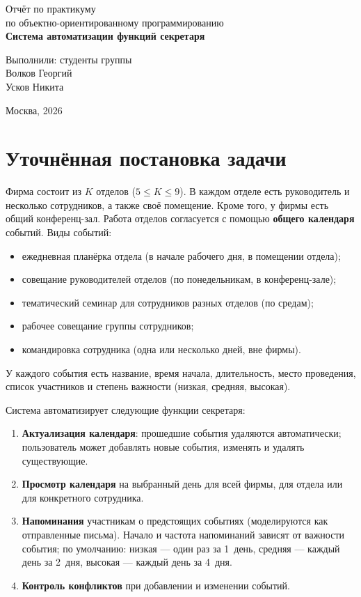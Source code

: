\documentclass[12pt,a4paper]{article}
\begin{document}
\begin{titlepage}
\centering
\vfill
{\large Отчёт по практикуму\\ по объектно-ориентированному программированию}\\[1cm]
{\LARGE\bfseries Система автоматизации функций секретаря}
\vfill
\begin{flushright}
Выполнили: студенты группы \underline{\hspace{2cm}}\\
Волков Георгий\\
Усков Никита
\end{flushright}
\vfill
Москва, 2026
\end{titlepage}

\tableofcontents
\newpage

\section{Уточнённая постановка задачи}

Фирма состоит из $K$ отделов ($5 \le K \le 9$). В каждом отделе есть руководитель
и несколько сотрудников, а также своё помещение. Кроме того, у фирмы есть общий
конференц-зал. Работа отделов согласуется с помощью \textbf{общего календаря}
событий. Виды событий:
\begin{itemize}
  \item ежедневная планёрка отдела (в начале рабочего дня, в помещении отдела);
  \item совещание руководителей отделов (по понедельникам, в конференц-зале);
  \item тематический семинар для сотрудников разных отделов (по средам);
  \item рабочее совещание группы сотрудников;
  \item командировка сотрудника (одна или несколько дней, вне фирмы).
\end{itemize}

У каждого события есть название, время начала, длительность, место проведения,
список участников и степень важности (низкая, средняя, высокая).

Система автоматизирует следующие функции секретаря:
\begin{enumerate}
  \item \textbf{Актуализация календаря}: прошедшие события удаляются автоматически;
        пользователь может добавлять новые события, изменять и удалять существующие.
  \item \textbf{Просмотр календаря} на выбранный день для всей фирмы,
        для отдела или для конкретного сотрудника.
  \item \textbf{Напоминания} участникам о предстоящих событиях (моделируются как
        отправленные письма). Начало и частота напоминаний зависят от важности
        события; по умолчанию: низкая --- один раз за 1~день, средняя --- каждый
        день за 2~дня, высокая --- каждый день за 4~дня.
  \item \textbf{Контроль конфликтов} при добавлении и изменении событий.
\end{enumerate}
\end{document}
